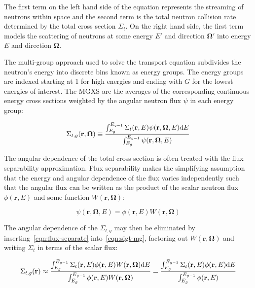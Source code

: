 The first term on the left hand side of the equation represents the streaming of neutrons within space and the second term is the total neutron collision rate determined by the total cross section $\Sigma_{t}$. On the right hand side, the first term models the scattering of neutrons at some energy $E'$ and direction $\mathbf{\Omega'}$ into energy $E$ and direction $\mathbf{\Omega}$. 

The multi-group approach used to solve the transport equation subdivides the neutron's energy into discrete bins known as energy groups. The energy groups are indexed starting at 1 for high energies and ending with $G$ for the lowest energies of interest. The MGXS are the averages of the corresponding continuous energy cross sections weighted by the angular neutron flux $\psi$ in each energy group:

\begin{dmath}
\label{eqn:sigt-mg}
\Sigma_{t,g}(\mathbf{r},\mathbf{\Omega}) \equiv \frac{\int\displaylimits_{E_{g}}^{E_{g-1}} \Sigma_{t}(\mathbf{r},E)\psi(\mathbf{r},\mathbf{\Omega},E)\mathrm{d}E}{\int\displaylimits_{E_{g}}^{E_{g-1}} \psi(\mathbf{r},\mathbf{\Omega},E)}
\end{dmath}

The angular dependence of the total cross section is often treated with the flux separability approximation. Flux separability makes the simplifying assumption that the energy and angular dependence of the flux varies independently such that the angular flux can be written as the product of the scalar neutron flux $\phi(\mathbf{r},E)$ and some function $W(\mathbf{r}, \mathbf{\Omega})$:

\begin{dmath}
\label{eqn:flux-separate}
\psi(\mathbf{r},\mathbf{\Omega},E) = \phi(\mathbf{r},E) W(\mathbf{r},\mathbf{\Omega})
\end{dmath}

\noindent The angular dependence of the $\Sigma_{t,g}$ may then be eliminated by inserting~\autoref{eqn:flux-separate} into~\autoref{eqn:sigt-mg}, factoring out $W(\mathbf{r},\mathbf{\Omega})$ and writing $\Sigma_{t}$ in terms of the scalar flux:

\begin{dmath}
\label{eqn:sigt-mg-scalar}
\Sigma_{t,g}(\mathbf{r}) \approx \frac{\int\displaylimits_{E_{g}}^{E_{g-1}} \Sigma_{t}(\mathbf{r},E)\phi(\mathbf{r},E)W(\mathbf{r},\mathbf{\Omega})\mathrm{d}E}{\int\displaylimits_{E_{g}}^{E_{g-1}} \phi(\mathbf{r},E)W(\mathbf{r},\mathbf{\Omega})} = \frac{\int\displaylimits_{E_{g}}^{E_{g-1}} \Sigma_{t}(\mathbf{r},E)\phi(\mathbf{r},E)\mathrm{d}E}{\int\displaylimits_{E_{g}}^{E_{g-1}} \phi(\mathbf{r},E)}
\end{dmath}

